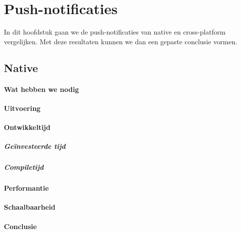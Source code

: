
\chapter{Push-notificaties}%
\label{ch:notificaties}

In dit hoofdstuk gaan we de push-notificaties van native en cross-platform vergelijken. Met deze resultaten kunnen we dan een gepaste conclusie vormen.

\section{Native}
\subsubsection{Wat hebben we nodig}

\subsubsection{Uitvoering}

\subsubsection{Ontwikkeltijd}

\paragraph{Geïnvesteerde tijd}

\paragraph{Compiletijd}

\subsubsection{Performantie}

\subsubsection{Schaalbaarheid}

\subsubsection{Conclusie}


